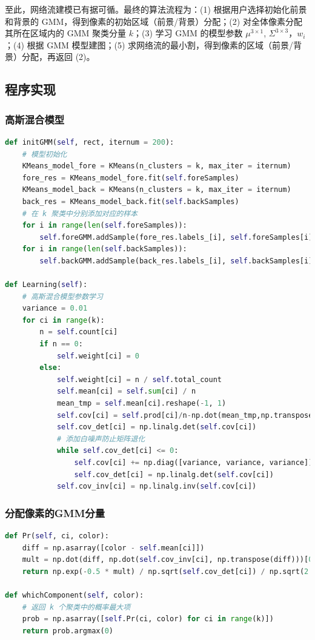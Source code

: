 \documentclass[lang=cn,11pt,a4paper]{elegantpaper}
\begin{document}
至此，网络流建模已有据可循。最终的算法流程为：(1) 根据用户选择初始化前景和背景的 GMM，得到像素的初始区域（前景/背景）分配；(2) 对全体像素分配其所在区域内的 GMM 聚类分量 $k$；(3) 学习 GMM 的模型参数 $\mu^{3\times1}$, $\Sigma^{3\times3}$，$w_i$；(4) 根据 GMM 模型建图；(5) 求网络流的最小割，得到像素的区域（前景/背景）分配，再返回 (2)。

\subsection{程序实现}

\subsubsection{高斯混合模型}

\begin{lstlisting}[language=Python]
def initGMM(self, rect, iternum = 200):
    # 模型初始化
    KMeans_model_fore = KMeans(n_clusters = k, max_iter = iternum)
    fore_res = KMeans_model_fore.fit(self.foreSamples)
    KMeans_model_back = KMeans(n_clusters = k, max_iter = iternum)
    back_res = KMeans_model_back.fit(self.backSamples)
    # 在 k 聚类中分别添加对应的样本
    for i in range(len(self.foreSamples)):
        self.foreGMM.addSample(fore_res.labels_[i], self.foreSamples[i])
    for i in range(len(self.backSamples)):
        self.backGMM.addSample(back_res.labels_[i], self.backSamples[i])

def Learning(self):
    # 高斯混合模型参数学习
    variance = 0.01
    for ci in range(k):
        n = self.count[ci]
        if n == 0:
            self.weight[ci] = 0
        else:
            self.weight[ci] = n / self.total_count
            self.mean[ci] = self.sum[ci] / n
            mean_tmp = self.mean[ci].reshape(-1, 1)
            self.cov[ci] = self.prod[ci]/n-np.dot(mean_tmp,np.transpose(mean_tmp))
            self.cov_det[ci] = np.linalg.det(self.cov[ci])
            # 添加白噪声防止矩阵退化
            while self.cov_det[ci] <= 0:
                self.cov[ci] += np.diag([variance, variance, variance])
                self.cov_det[ci] = np.linalg.det(self.cov[ci])
            self.cov_inv[ci] = np.linalg.inv(self.cov[ci])
\end{lstlisting}

\subsubsection{分配像素的GMM分量}

\begin{lstlisting}[language=Python]
def Pr(self, ci, color):
    diff = np.asarray([color - self.mean[ci]])
    mult = np.dot(diff, np.dot(self.cov_inv[ci], np.transpose(diff)))[0][0]
    return np.exp(-0.5 * mult) / np.sqrt(self.cov_det[ci]) / np.sqrt(2 * np.pi)

def whichComponent(self, color):
    # 返回 k 个聚类中的概率最大项
    prob = np.asarray([self.Pr(ci, color) for ci in range(k)])
    return prob.argmax(0)
\end{lstlisting}
\end{document}

